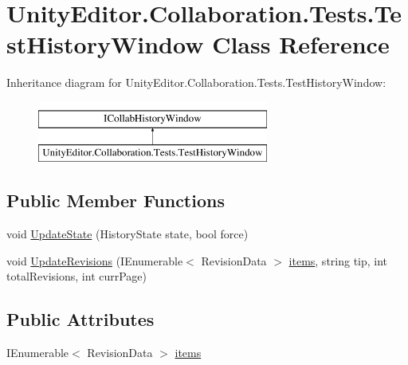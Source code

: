 \hypertarget{class_unity_editor_1_1_collaboration_1_1_tests_1_1_test_history_window}{}\section{Unity\+Editor.\+Collaboration.\+Tests.\+Test\+History\+Window Class Reference}
\label{class_unity_editor_1_1_collaboration_1_1_tests_1_1_test_history_window}
Inheritance diagram for Unity\+Editor.\+Collaboration.\+Tests.\+Test\+History\+Window\+:\begin{figure}[H]
\begin{center}
\leavevmode
\includegraphics[height=2.000000cm]{class_unity_editor_1_1_collaboration_1_1_tests_1_1_test_history_window}
\end{center}
\end{figure}
\subsection*{Public Member Functions}
\begin{DoxyCompactItemize}
\item 
void \mbox{\hyperlink{class_unity_editor_1_1_collaboration_1_1_tests_1_1_test_history_window_ae36c3e34b7ea55f9142251ff4fc0a7db}{Update\+State}} (History\+State state, bool force)
\item 
void \mbox{\hyperlink{class_unity_editor_1_1_collaboration_1_1_tests_1_1_test_history_window_a03d65448ca22f7bf170d4ef0673b48cc}{Update\+Revisions}} (I\+Enumerable$<$ Revision\+Data $>$ \mbox{\hyperlink{class_unity_editor_1_1_collaboration_1_1_tests_1_1_test_history_window_af348109cc3edbf923cae66a0482e3474}{items}}, string tip, int total\+Revisions, int curr\+Page)
\end{DoxyCompactItemize}
\subsection*{Public Attributes}
\begin{DoxyCompactItemize}
\item 
I\+Enumerable$<$ Revision\+Data $>$ \mbox{\hyperlink{class_unity_editor_1_1_collaboration_1_1_tests_1_1_test_history_window_af348109cc3edbf923cae66a0482e3474}{items}}
\end{DoxyCompactItemize}
